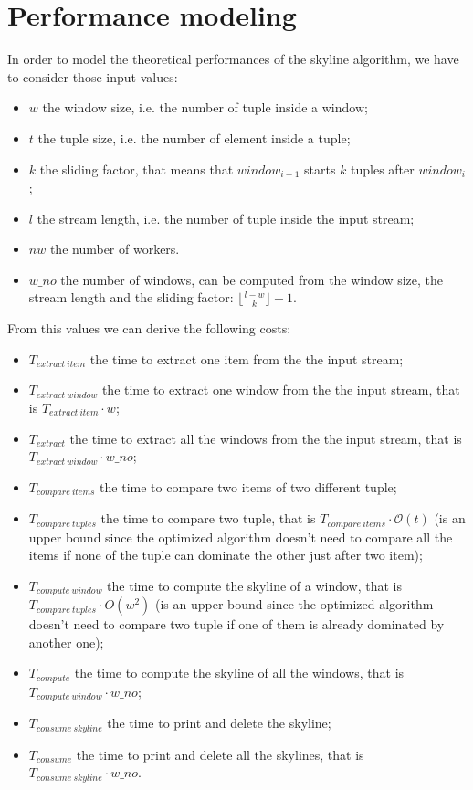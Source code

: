 \section{Performance modeling}

In order to model the theoretical performances of the skyline algorithm, we have to consider those input values:
\begin{itemize}
    \item $w$ the window size, i.e. the number of tuple inside a window;
    \item $t$ the tuple size, i.e. the number of element inside a tuple;
    \item $k$ the sliding factor, that means that $window_{i+1}$ starts $k$ tuples after $window_i$;
    \item $l$ the stream length, i.e. the number of tuple inside the input stream;
    \item $nw$ the number of workers.
    \item $w\_no$ the number of windows, can be computed from the window size, the stream length and the sliding factor: $\lfloor\frac{l-w}{k}\rfloor+1$.
\end{itemize}

\bigskip\noindent
From this values we can derive the following costs:
\begin{itemize}
    \item $T_{extract\ item}$ the time to extract one item from the the input stream;
    \item $T_{extract\ window}$ the time to extract one window from the the input stream, that is $T_{extract\ item} \cdot w$;
    \item $T_{extract}$ the time to extract all the windows from the the input stream, that is $T_{extract\ window} \cdot w\_no$;
    \item $T_{compare\ items}$ the time to compare two items of two different tuple;
    \item $T_{compare\ tuples}$ the time to compare two tuple, that is $T_{compare\ items} \cdot \mathcal{O}(t)$ (is an upper bound since the optimized algorithm doesn't need to compare all the items if none of the tuple can dominate the other just after two item);
    \item $T_{compute\ window}$ the time to compute the skyline of a window, that is $T_{compare\ tuples} \cdot O(w^2)$ (is an upper bound since the optimized algorithm doesn't need to compare two tuple if one of them is already dominated by another one);
    \item $T_{compute}$ the time to compute the skyline of all the windows, that is $T_{compute\ window} \cdot w\_no$;
    \item $T_{consume\ skyline}$ the time to print and delete the skyline;
    \item $T_{consume}$ the time to print and delete all the skylines, that is $T_{consume\ skyline} \cdot w\_no$.
\end{itemize}


